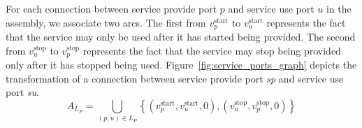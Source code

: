 For each connection between service provide port $p$ and service use port
$u$ in the assembly, we associate two arcs. The first from
$v_p^\text{start}$ to $v_u^\text{start}$ represents the fact that the
service may only be used after it has started being provided.
The second from $v_u^\text{stop}$ to $v_p^\text{stop}$ represents the fact
that the service may stop being provided only after it has stopped being
used.
Figure~\ref{fig:service_ports_graph} depicts the transformation of a
connection between service provide port \emph{sp} and service use port
\emph{su}.
\[
A_{L_{P}}=\bigcup_{\left(p,u\right)\in L_{P}}\left\{ \left(v_p^\text{start},v_u^\text{start},0\right),\left(v_u^\text{stop},v_p^\text{stop},0\right)\right\} 
\]

\begin{figure}[h]
\end{figure}
